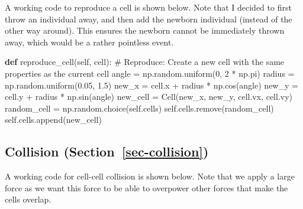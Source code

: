 \documentclass[
  letterpaper,
  DIV=11,
  numbers=noendperiod]{scrreprt}
\newenvironment{Shaded}{\begin{snugshade}}{\end{snugshade}}
\newcommand{\CommentTok}[1]{\textcolor[rgb]{0.37,0.37,0.37}{#1}}
\newcommand{\DecValTok}[1]{\textcolor[rgb]{0.68,0.00,0.00}{#1}}
\newcommand{\FloatTok}[1]{\textcolor[rgb]{0.68,0.00,0.00}{#1}}
\newcommand{\KeywordTok}[1]{\textcolor[rgb]{0.00,0.23,0.31}{\textbf{#1}}}
\newcommand{\NormalTok}[1]{\textcolor[rgb]{0.00,0.23,0.31}{#1}}
\newcommand{\OperatorTok}[1]{\textcolor[rgb]{0.37,0.37,0.37}{#1}}
\newcommand{\VariableTok}[1]{\textcolor[rgb]{0.07,0.07,0.07}{#1}}
\theoremstyle{definition}
\theoremstyle{remark}
\begin{document}
A working code to reproduce a cell is shown below. Note that I decided
to first throw an individual away, and then add the newborn individual
(instead of the other way around). This ensures the newborn cannot be
immediately thrown away, which would be a rather pointless event.

\begin{Shaded}
\begin{Highlighting}[]
\KeywordTok{def}\NormalTok{ reproduce\_cell(}\VariableTok{self}\NormalTok{, cell):}
        \CommentTok{\# Reproduce: Create a new cell with the same properties as the current cell}
\NormalTok{        angle }\OperatorTok{=}\NormalTok{ np.random.uniform(}\DecValTok{0}\NormalTok{, }\DecValTok{2} \OperatorTok{*}\NormalTok{ np.pi)}
\NormalTok{        radius }\OperatorTok{=}\NormalTok{ np.random.uniform(}\FloatTok{0.05}\NormalTok{, }\FloatTok{1.5}\NormalTok{)}
\NormalTok{        new\_x }\OperatorTok{=}\NormalTok{ cell.x }\OperatorTok{+}\NormalTok{ radius }\OperatorTok{*}\NormalTok{ np.cos(angle)}
\NormalTok{        new\_y }\OperatorTok{=}\NormalTok{ cell.y }\OperatorTok{+}\NormalTok{ radius }\OperatorTok{*}\NormalTok{ np.sin(angle)}
\NormalTok{        new\_cell }\OperatorTok{=}\NormalTok{ Cell(new\_x, new\_y, cell.vx, cell.vy)}
\NormalTok{        random\_cell }\OperatorTok{=}\NormalTok{ np.random.choice(}\VariableTok{self}\NormalTok{.cells)   }
        \VariableTok{self}\NormalTok{.cells.remove(random\_cell)}
        \VariableTok{self}\NormalTok{.cells.append(new\_cell)}
\end{Highlighting}
\end{Shaded}

\subsection{\texorpdfstring{Collision
(Section~\ref{sec-collision})}{Collision (Section~)}}\label{collision-sec-collision}

A working code for cell-cell collision is shown below. Note that we
apply a large force as we want this force to be able to overpower other
forces that make the cells overlap.
\end{document}

